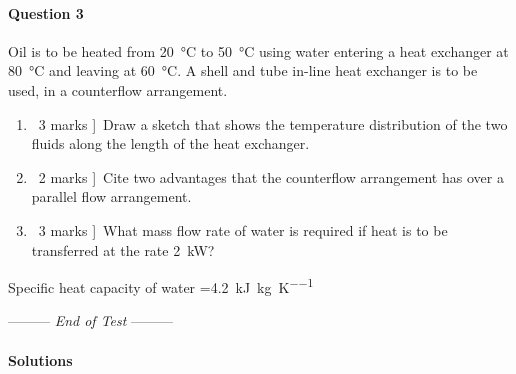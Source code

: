 \documentclass[a4paper,12pt,fleqn]{article}
\newcommand{\lastwords}{End of Test}
\begin{document}
\paragraph{\textbf{Question 3} \ }
Oil is to be heated from \SI{20}{\celsius} to \SI{50}{\celsius} using water entering a heat exchanger at \SI{80}{\celsius} and leaving at \SI{60}{\celsius}. A shell and tube in-line heat exchanger is to be used, in a counterflow arrangement. 
\begin{enumerate}[label=\alph*)]
\item \lbrack\ 3 marks ]\ Draw a sketch that shows the temperature distribution of the two fluids along the length of the heat exchanger.
\item \lbrack\ 2 marks ]\ Cite two advantages that the counterflow arrangement has over a parallel flow arrangement.
\item \lbrack\ 3 marks ]\ What mass flow rate of water is required if heat is to be transferred at the rate \SI{2}{\kilo\watt}?
\end{enumerate}
Specific heat capacity of water =\SI{4.2}{\kilo\joule\per\kg\per\kelvin}



\begin{center}
\vspace{3cm}
--------- \textit{\lastwords} ---------
\end{center}


\label{finalpage}
\newpage
\paragraph{\textbf{Solutions} \ }
\end{document}
